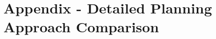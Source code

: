 \chapter{Appendix - Detailed Planning Approach Comparison}
%    
%        
%        
%    
%    
%    

